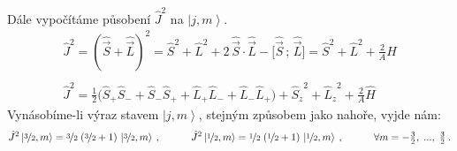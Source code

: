 \documentclass[10pt,a4paper]{article}
\newcommand{\ket}[1]{\left| #1 \right>}
\newcommand{\vechat}[1]{\hat{\vec{#1}}}
\begin{document}
Dále vypočítáme působení $\hat J^2$ na $\ket{j,m}$.
\begin{gather*}
    \hat J^2
    = \left( \vechat S + \vechat L \right)^2
    = \hat S^2 + \hat L^2 + 2 \, \vechat S \cdot \vechat L - \big[ \vechat S \,{;}\, \vechat L \big]
    = \hat S^2 + \hat L^2 + \frac{2}{A} \hat H
    \\\\
    \hat J^2
    = \frac{1}{2} \big(
        \hat S_+ \hat S_- +
        \hat S_- \hat S_+ +
        \hat L_+ \hat L_- +
        \hat L_- \hat L_+
    \big)
    + {\hat S_z}^2 + {\hat L_z}^2
    + \frac{2}{A} \hat H
\end{gather*}
Vynásobíme-li výraz stavem $\ket{j,m}$, stejným způsobem jako nahoře, vyjde nám:
\begin{equation*}
    \hat J^2 \ket{\nicefrac{3}{2}, m}
    = \nicefrac{3}{2} \; (\nicefrac{3}{2} + 1) \,
    \ket{\nicefrac{3}{2}, m}
    \: , \hspace{3em}
    \hat J^2 \ket{\nicefrac{1}{2}, m}
    = \nicefrac{1}{2} \; (\nicefrac{1}{2} + 1) \,
    \ket{\nicefrac{1}{2}, m}
    \: , \hspace{3em}
    \forall m = -\tfrac{3}{2}, \; {...}, \; \tfrac{3}{2}
    \: .
\end{equation*}
\end{document}
